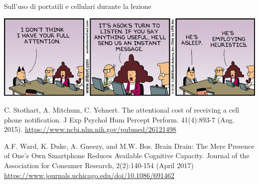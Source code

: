 \begin{frame}{Sull'uso di portatili e cellulari durante la lezione}
	
\vspace{-6pt}
\begin{center}
\includegraphics[width=1.0\textwidth]{attention.png}
\end{center}

\footnotesize
\BI
\item C. Stothart, A. Mitchum, C. Yehnert. \alert{The attentional cost of receiving a cell phone notification}. J Exp Psychol Hum Percept Perform. 41(4):893-7 (Aug. 2015).
\url{https://www.ncbi.nlm.nih.gov/pubmed/26121498}

\item A.F. Ward, K. Duke, A. Gneezy, and M.W. Bos. 
\alert{Brain Drain: The Mere Presence of One’s Own Smartphone Reduces Available Cognitive Capacity}. 
Journal of the Association for Consumer Research, 2(2):140-154 (April 2017) \\
\url{https://www.journals.uchicago.edu/doi/10.1086/691462}

\EI

\end{frame}


